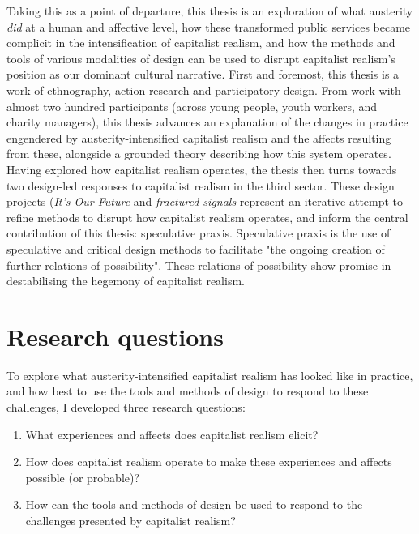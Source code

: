 Taking this as a point of departure, this thesis is an exploration of what austerity \emph{did} at a human and affective level, how these transformed public services became complicit in the intensification of capitalist realism, and how the methods and tools of various modalities of design can be used to disrupt capitalist realism's position as our dominant cultural narrative. First and foremost, this thesis is a work of ethnography, action research and participatory design. From work with almost two hundred participants (across young people, youth workers, and charity managers), this thesis advances an explanation of the changes in practice engendered by austerity-intensified capitalist realism and the affects resulting from these, alongside a grounded theory describing how this system operates. Having explored how capitalist realism operates, the thesis then turns towards two design-led responses to capitalist realism in the third sector. These design projects (\emph{It's Our Future} and \emph{fractured signals} represent an iterative attempt to refine methods to disrupt how capitalist realism operates, and inform the central contribution of this thesis: speculative praxis. Speculative praxis is the use of speculative and critical design methods to facilitate "the ongoing creation of further relations of possibility". These relations of possibility show promise in destabilising the hegemony of capitalist realism.  %



\section{Research questions}
To explore what austerity-intensified capitalist realism has looked like in practice, and how best to use the tools and methods of design to respond to these challenges, I developed three research questions: 
\begin{enumerate}
    \item What experiences and affects does capitalist realism elicit?
    \item How does capitalist realism operate to make these experiences and affects possible (or probable)?
    \item How can the tools and methods of design be used to respond to the challenges presented by capitalist realism?
\end{enumerate}


